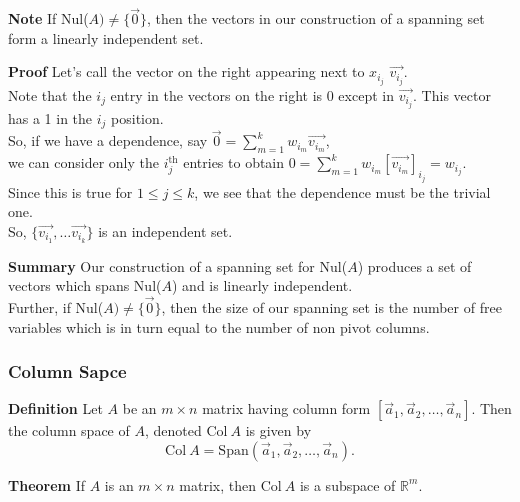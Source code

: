  \begin{frame}[fragile]

\textbf{Note}
 If Nul($A)\neq \{\vec{0}\}$, then the vectors in our construction of a spanning set form a linearly independent set.



\textbf{Proof}
Let's call the vector on the right appearing next to $x_{i_j}$ $\vec{v_{i_j}}$.  \\ 
Note that the $i_j$ entry in the vectors on the right is 0 except in $\vec{v_{i_j}}$.  This vector has a 1 in the $i_j$ position.   \\ 
So, if we have a dependence, say  $\vec{0} = \sum_{m=1}^k w_{i_m}\vec{v_{i_m}}$,   \\ 
we can consider only the $i_j^{\mbox{th}}$ entries to obtain $0= \sum_{m=1}^k w_{i_m} [\vec{v_{i_m}}]_{i_j} =  w_{i_j}$.  \\ 
Since this is true for $1\le j\le k$, we see that the dependence must be the trivial one.  \\ 
So, $\{ \vec{v_{i_1}}, \dots \vec{v_{i_k}} \}$ is an independent set.

\end{frame}





 \begin{frame}[fragile]

\textbf{Summary}
Our construction of a spanning set for Nul($A$) produces a set of vectors which spans Nul($A$) and is linearly independent.  \\ 
Further, if Nul($A) \neq \{\vec{0}\}$, then the size of our spanning set is the number of free variables which is in turn equal to the number of non pivot columns.

\end{frame}






 \begin{frame}[fragile]\frametitle{Column Sapce}
\textbf{Definition}
Let $A$ be an $m \times n$ matrix having column form 
$[ \vec{a}_1, \vec{a}_2, \dots , \vec{a}_n ]$.  Then the column space
of $A$, denoted $\mbox{Col}\ A$ is given by 
\[
\mbox{Col} \ A = \mbox{Span}(\vec{a}_1, \vec{a}_2, \dots , \vec{a}_n).
\]



\textbf{Theorem}
If $A$ is an $m \times n$ matrix, then $\mbox{Col} \ A$ is a subspace of $\mathbb R^m$.

\end{frame}






